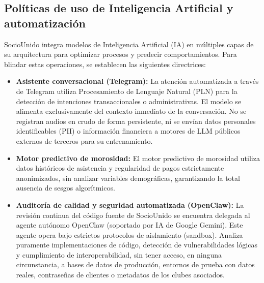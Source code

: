\subsection{Políticas de uso de Inteligencia Artificial y automatización}
SocioUnido integra modelos de Inteligencia Artificial (IA) en múltiples capas de su arquitectura para optimizar procesos y predecir comportamientos. Para blindar estas operaciones, se establecen las siguientes directrices:

\begin{itemize}
    \item \textbf{Asistente conversacional (Telegram):} La atención automatizada a través de Telegram utiliza Procesamiento de Lenguaje Natural (PLN) para la detección de intenciones transaccionales o administrativas. El modelo se alimenta exclusivamente del contexto inmediato de la conversación. No se registran audios en crudo de forma persistente, ni se envían datos personales identificables (PII) o información financiera a motores de LLM públicos externos de terceros para su entrenamiento.
    \item \textbf{Motor predictivo de morosidad:} El motor predictivo de morosidad utiliza datos históricos de asistencia y regularidad de pagos estrictamente anonimizados, sin analizar variables demográficas, garantizando la total ausencia de sesgos algorítmicos.
    \item \textbf{Auditoría de calidad y seguridad automatizada (OpenClaw):} La revisión continua del código fuente de SocioUnido se encuentra delegada al agente autónomo OpenClaw (soportado por IA de Google Gemini). Este agente opera bajo estrictos protocolos de aislamiento (sandbox). Analiza puramente implementaciones de código, detección de vulnerabilidades lógicas y cumplimiento de interoperabilidad, sin tener acceso, en ninguna circunstancia, a bases de datos de producción, entornos de prueba con datos reales, contraseñas de clientes o metadatos de los clubes asociados.
\end{itemize}


